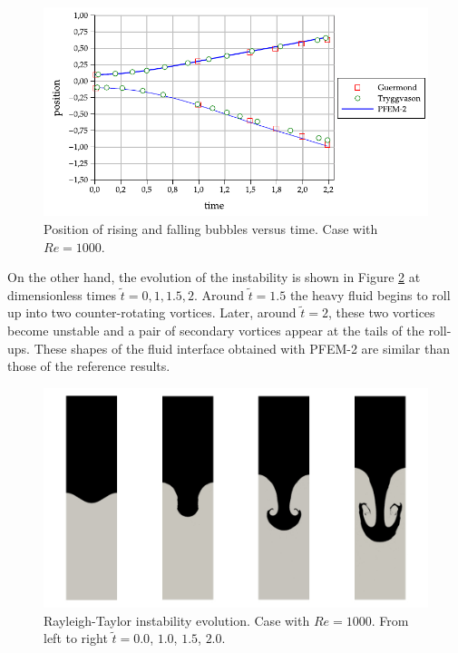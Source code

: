 \documentclass[a4paper,conference]{IEEEtran}
\begin{document}
\begin{figure}[htbp]
  \begin{center}
      \includegraphics[width=\columnwidth]{images/rayleigh_1.pdf}
  \end{center}
  \caption{\label{fg:rayleigh-rf} Position of rising and falling bubbles versus time. Case with $Re=1000$.}
\end{figure}

On the other hand, the evolution of the instability is shown in Figure \ref{fg:rayleigh-screenshots} at dimensionless times $\widetilde{t}=0, 1, 1.5, 2$. Around $\widetilde{t}=1.5$ the heavy fluid begins to roll up into two counter-rotating vortices. Later, around $\widetilde{t} = 2$, these two vortices become unstable and a pair of secondary vortices appear at the tails of the roll-ups. These shapes of the fluid interface obtained with PFEM-2 are similar than those of the reference results.


\begin{figure}[htbp]
  \begin{center}
      \includegraphics[width=\columnwidth]{images/rayleigh_2.jpg}
  \end{center}
  \caption{\label{fg:rayleigh-screenshots} Rayleigh-Taylor instability evolution. Case with $Re=1000$. From left to right $\widetilde{t} =0.0$, $1.0$, $1.5$, $2.0$.}
\end{figure}
\end{document}
